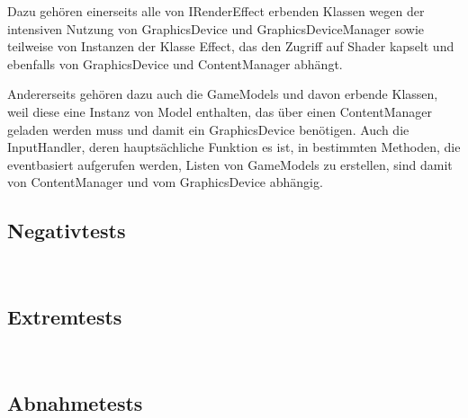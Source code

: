 Dazu gehören einerseits alle von IRenderEffect erbenden Klassen wegen der intensiven Nutzung von GraphicsDevice und GraphicsDeviceManager sowie teilweise von Instanzen der Klasse Effect, das den Zugriff auf Shader kapselt und ebenfalls von GraphicsDevice und ContentManager abhängt.

Andererseits gehören dazu auch die GameModels und davon erbende Klassen, weil diese eine Instanz von Model enthalten, das über einen ContentManager geladen werden muss und damit ein GraphicsDevice benötigen. Auch die InputHandler, deren hauptsächliche Funktion es ist, in bestimmten Methoden, die eventbasiert aufgerufen werden, Listen von GameModels zu erstellen, sind damit von ContentManager und vom GraphicsDevice abhängig.
~\\




\subsection*{Negativtests}
\label{Abschnitt:Tests:Nicht:Negativ}

~\\




\subsection*{Extremtests}
\label{Abschnitt:Tests:Nicht:Extrem}

~\\




\subsection*{Abnahmetests}
\label{Abschnitt:Tests:Nicht:Abnahme}

~\\


